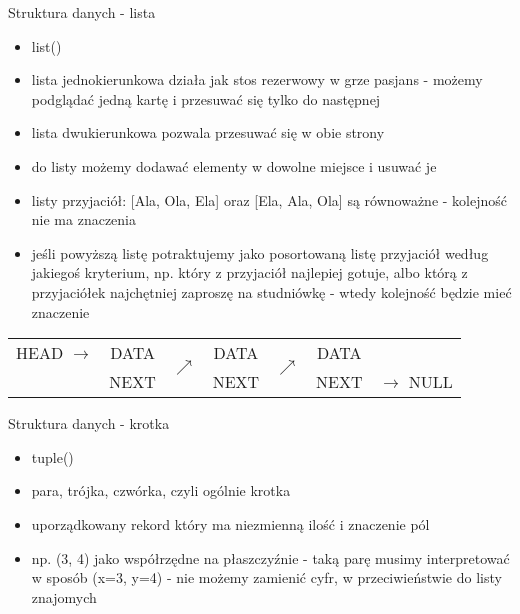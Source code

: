 \begin{frame}{Struktura danych - lista}
    \begin{small}
        \begin{itemize}
            \item list() \\
            \item lista jednokierunkowa działa jak stos rezerwowy w grze pasjans - możemy
            podglądać jedną kartę i przesuwać się tylko do następnej \\
            \item lista dwukierunkowa pozwala przesuwać się w obie strony \\
            \item do listy możemy dodawać elementy w dowolne miejsce i usuwać je \\
            \item listy przyjaciół: [Ala, Ola, Ela] oraz [Ela, Ala, Ola] są równoważne - kolejność
            nie ma znaczenia \\
            \item jeśli powyższą listę potraktujemy jako posortowaną listę przyjaciół według jakiegoś
            kryterium, np. który z przyjaciół najlepiej gotuje, albo którą z przyjaciółek najchętniej
            zaproszę na studniówkę - wtedy kolejność będzie mieć znaczenie
        \end{itemize}
    \end{small}
    \begin{table}
        \centering
        \begin{tabular}{c|c|c|c|c|c|c}
            \cline{2-2} \cline{4-4} \cline{6-6}
            HEAD $\longrightarrow$ & DATA & \multirow{ 2}{*}{$\nearrow$} & DATA & \multirow{ 2}{*}{$\nearrow$} & DATA & \\
            \cline{2-2} \cline{4-4} \cline{6-6}
            & NEXT & & NEXT & & NEXT & $\longrightarrow$ NULL \\
            \cline{2-2} \cline{4-4} \cline{6-6}
        \end{tabular}
    \end{table}
\end{frame}

\begin{frame}{Struktura danych - krotka}
    \begin{itemize}
        \item tuple() \\
        \item para, trójka, czwórka, czyli ogólnie krotka \\
        \item uporządkowany rekord który ma niezmienną ilość i znaczenie pól \\
        \item np. (3, 4) jako współrzędne na płaszczyźnie - taką parę musimy interpretować
        w sposób (x=3, y=4) - nie możemy zamienić cyfr, w przeciwieństwie do listy znajomych
    \end{itemize}
\end{frame}


